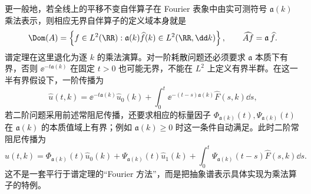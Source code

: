 更一般地，若全线上的平移不变自伴算子在 Fourier 表象中由实可测符号 $\mathfrak a(k)$ 乘法表示，则相应无界自伴算子的定义域本身就是
\[
 \Dom(A)=\left\{f\in L^2(\RR):\mathfrak a(k)\widehat f(k)\in L^2(\RR,\dd k)\right\},
 \qquad
 \widehat{Af}=\mathfrak a\,\widehat f.
\]
谱定理在这里退化为逐 $k$ 的乘法演算。对一阶耗散问题还必须要求 $\mathfrak a$ 本质下有界，否则 $\ee^{-t\mathfrak a(k)}$ 在固定 $t>0$ 也可能无界，不能在 $L^2$ 上定义有界半群。在这一半有界假设下，一阶传播为
\begin{equation*}\widehat u(t,k)=\ee^{-t\mathfrak a(k)}\widehat u_0(k)
 +\int_0^t\ee^{-(t-s)\mathfrak a(k)}\widehat F(s,k)\dd s,
\end{equation*}
若二阶问题采用前述常阻尼传播，还要求相应的标量因子 $\Phi_{\mathfrak a(k)}(t),\Psi_{\mathfrak a(k)}(t)$ 在 $\mathfrak a(k)$ 的本质值域上有界；例如 $\mathfrak a(k)\ge0$ 时这一条件自动满足。此时二阶常阻尼传播为
\begin{equation*}\widehat u(t,k)=\Phi_{\mathfrak a(k)}(t)\widehat u_0(k)
 +\Psi_{\mathfrak a(k)}(t)\widehat u_1(k)
 +\int_0^t\Psi_{\mathfrak a(k)}(t-s)\widehat F(s,k)\dd s.
\end{equation*}
这不是一套平行于谱定理的“Fourier 方法”，而是把抽象谱表示具体实现为乘法算子的特例。

